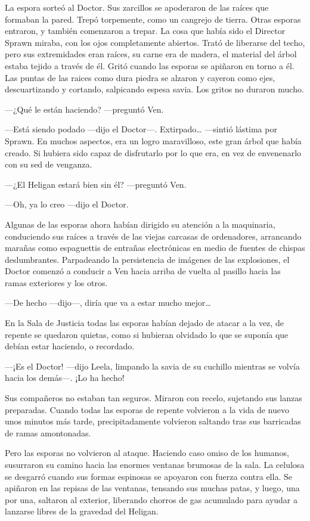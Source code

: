 La espora sorteó al Doctor. Sus zarcillos se apoderaron de las raíces
que formaban la pared. Trepó torpemente, como un cangrejo de tierra.
Otras esporas entraron, y también comenzaron a trepar. La cosa que había
sido el Director Sprawn miraba, con los ojos completamente abiertos.
Trató de liberarse del techo, pero sus extremidades eran raíces, su
carne era de madera, el material del árbol estaba tejido a través de él.
Gritó cuando las esporas se apiñaron en torno a él. Las puntas de las
raices como dura piedra se alzaron y cayeron como ejes, descuartizando y
cortando, salpicando espesa savia. Los gritos no duraron mucho.

---¿Qué le están haciendo? ---preguntó Ven.

---Está siendo podado ---dijo el Doctor---. Extirpado\ldots{} ---sintió
lástima por Sprawn. En muchos aspectos, era un logro maravilloso, este
gran árbol que había creado. Si hubiera sido capaz de disfrutarlo por lo
que era, en vez de envenenarlo con su sed de venganza.

---¿El Heligan estará bien sin él? ---preguntó Ven.

---Oh, ya lo creo ---dijo el Doctor.

Algunas de las esporas ahora habían dirigido su atención a la
maquinaria, conduciendo sus raíces a través de las viejas carcasas de
ordenadores, arrancando marañas como espaguettis de entrañas
electrónicas en medio de fuentes de chispas deslumbrantes. Parpadeando
la persistencia de imágenes de las explosiones, el Doctor comenzó a
conducir a Ven hacia arriba de vuelta al pasillo hacia las ramas
exteriores y los otros.

---De hecho ---dijo---, diría que va a estar mucho mejor\ldots{}

En la Sala de Justicia todas las esporas habían dejado de atacar a la
vez, de repente se quedaron quietas, como si hubieran olvidado lo que se
suponía que debían estar haciendo, o recordado.

---¡Es el Doctor! ---dijo Leela, limpando la savia de su cuchillo
mientras se volvía hacia los demás---. ¡Lo ha hecho!

Sus compañeros no estaban tan seguros. Miraron con recelo, sujetando sus
lanzas preparadas. Cuando todas las esporas de repente volvieron a la
vida de nuevo unos minutos más tarde, precipitadamente volvieron
saltando tras sus barricadas de ramas amontonadas.

Pero las esporas no volvieron al ataque. Haciendo caso omiso de los
humanos, susurraron su camino hacia las enormes ventanas brumosas de la
sala. La celulosa se desgarró cuando sus formas espinosas se apoyaron
con fuerza contra ella. Se apiñaron en las repisas de las ventanas,
tensando sus muchas patas, y luego, una por una, saltaron al exterior,
liberando chorros de gas acumulado para ayudar a lanzarse libres de la
gravedad del Heligan.

